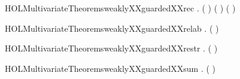 \newcommand{\HOLMultivariateTheoremsweaklyXXguardedXXprefix}{\UseVerbatim{HOLMultivariateTheoremsweaklyXXguardedXXprefix}}
\begin{SaveVerbatim}{HOLMultivariateTheoremsweaklyXXguardedXXrec}
\HOLTokenTurnstile{} \HOLSymConst{\HOLTokenForall{}}  .
         (  ) \HOLSymConst{\HOLTokenImp{}}
       \HOLSymConst{\HOLTokenNeg{}}   \HOLSymConst{\HOLTokenConj{}}  ( ) ( ) \HOLSymConst{\HOLTokenConj{}}
         
\end{SaveVerbatim}
\newcommand{\HOLMultivariateTheoremsweaklyXXguardedXXrec}{\UseVerbatim{HOLMultivariateTheoremsweaklyXXguardedXXrec}}
\begin{SaveVerbatim}{HOLMultivariateTheoremsweaklyXXguardedXXrelab}
\HOLTokenTurnstile{} \HOLSymConst{\HOLTokenForall{}}  .
         (  ) \HOLSymConst{\HOLTokenImp{}}   
\end{SaveVerbatim}
\newcommand{\HOLMultivariateTheoremsweaklyXXguardedXXrelab}{\UseVerbatim{HOLMultivariateTheoremsweaklyXXguardedXXrelab}}
\begin{SaveVerbatim}{HOLMultivariateTheoremsweaklyXXguardedXXrestr}
\HOLTokenTurnstile{} \HOLSymConst{\HOLTokenForall{}}  .   (\HOLConst{\ensuremath{\nu}}  ) \HOLSymConst{\HOLTokenImp{}}   
\end{SaveVerbatim}
\newcommand{\HOLMultivariateTheoremsweaklyXXguardedXXrestr}{\UseVerbatim{HOLMultivariateTheoremsweaklyXXguardedXXrestr}}
\begin{SaveVerbatim}{HOLMultivariateTheoremsweaklyXXguardedXXsum}
\HOLTokenTurnstile{} \HOLSymConst{\HOLTokenForall{}}  .
         ( \HOLSymConst{\ensuremath{+}} ) \HOLSymConst{\HOLTokenImp{}}
          \HOLSymConst{\HOLTokenConj{}}   
\end{SaveVerbatim}
